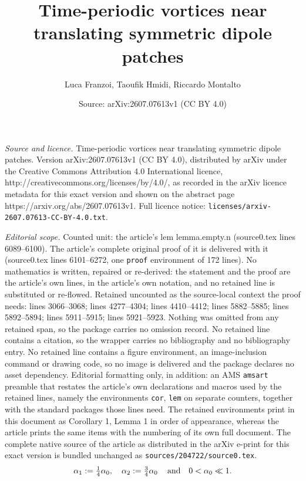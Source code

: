 \documentclass[10pt,a4paper]{amsart}
\title{Time-periodic vortices near translating symmetric dipole patches}
\author{Luca Franzoi, Taoufik Hmidi, Riccardo Montalto}
\date{Source: arXiv:2607.07613v1 (CC BY 4.0)}
\begin{document}
\maketitle

\noindent\emph{Source and licence.} Time-periodic vortices near translating symmetric dipole patches. Version arXiv:2607.07613v1 (CC BY 4.0), distributed by arXiv under the Creative Commons Attribution 4.0 International licence, http://creativecommons.org/licenses/by/4.0/, as recorded in the arXiv licence metadata for this exact version and shown on the abstract page https://arxiv.org/abs/2607.07613v1. Full licence notice: \texttt{licenses/arxiv-2607.07613-CC-BY-4.0.txt}.\par\smallskip

\noindent\textit{Editorial scope.} Counted unit: the article's lem lemma.empty.n (source0.tex lines 6089--6100). The article's complete original proof of it is delivered with it (source0.tex lines 6101--6272, one \texttt{proof} environment of 172 lines). No mathematics is written, repaired or re-derived: the statement and the proof are the article's own lines, in the article's own notation, and no retained line is substituted or re-flowed.  Retained uncounted as the source-local context the proof needs: lines 3066--3068; lines 4277--4304; lines 4410--4412; lines 5882--5885; lines 5892--5894; lines 5911--5915; lines 5921--5923.  Nothing was omitted from any retained span, so the package carries no omission record.  No retained line contains a citation, so the wrapper carries no bibliography and no bibliography entry.  No retained line contains a figure environment, an image-inclusion command or drawing code, so no image is delivered and the package declares no asset dependency.  Editorial formatting only, in addition: an AMS \texttt{amsart} preamble that restates the article's own declarations and macros used by the retained lines, namely the environments \texttt{cor}, \texttt{lem} on separate counters, together with the standard packages those lines need.  The retained environments print in this document as Corollary 1, Lemma 1 in order of appearance, whereas the article prints the same items with the numbering of its own full document.  The complete native source of the article as distributed in the arXiv e-print for this exact version is bundled unchanged as \texttt{sources/204722/source0.tex}.
\begin{equation}\label{alpha1alpha2}
	  \alpha_1:=\tfrac14 \alpha_{0} ,\quad  \alpha_{2} := \tfrac34 \alpha_{0} \,\quad\hbox{and}\quad  0<\alpha_{0} \ll 1.
\end{equation}
\end{document}
